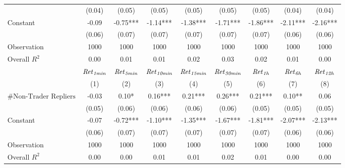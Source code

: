 \begin{tabular}{lcccccccc}
 & (0.04) & (0.05) & (0.05) & (0.05) & (0.05) & (0.05) & (0.04) & (0.04) \\
Constant & -0.09 & -0.75*** & -1.14*** & -1.38*** & -1.71*** & -1.86*** & -2.11*** & -2.16*** \\
 & (0.06) & (0.07) & (0.07) & (0.07) & (0.07) & (0.07) & (0.06) & (0.06) \\
Observation & 1000 & 1000 & 1000 & 1000 & 1000 & 1000 & 1000 & 1000 \\
Overall $R^2$ & 0.00 & 0.01 & 0.01 & 0.02 & 0.03 & 0.02 & 0.01 & 0.00 \\
\hline
 & ${\it Ret}_{\it 1min}$ & ${\it Ret}_{\it 5min}$ & ${\it Ret}_{\it 10min}$ & ${\it Ret}_{\it 15min}$ & ${\it Ret}_{\it 30min}$ & ${\it Ret}_{\it 1h}$ & ${\it Ret}_{\it 6h}$ & ${\it Ret}_{\it 12h}$ \\
 & (1) & (2) & (3) & (4) & (5) & (6) & (7) & (8) \\
\hline
$\#\text{Non-Trader Repliers}$ & -0.03 & 0.10* & 0.16*** & 0.21*** & 0.26*** & 0.21*** & 0.10** & 0.06 \\
 & (0.05) & (0.06) & (0.06) & (0.06) & (0.06) & (0.05) & (0.05) & (0.05) \\
Constant & -0.07 & -0.72*** & -1.10*** & -1.35*** & -1.67*** & -1.81*** & -2.07*** & -2.13*** \\
 & (0.06) & (0.07) & (0.07) & (0.07) & (0.07) & (0.07) & (0.06) & (0.06) \\
Observation & 1000 & 1000 & 1000 & 1000 & 1000 & 1000 & 1000 & 1000 \\
Overall $R^2$ & 0.00 & 0.00 & 0.01 & 0.01 & 0.02 & 0.01 & 0.00 & 0.00 \\
\hline
\end{tabular}
